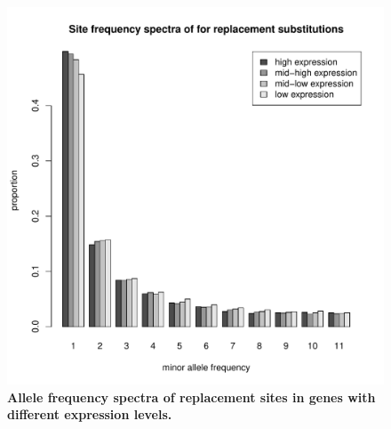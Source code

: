 \begin{figure}[h!]
      \centering
       \includegraphics[width=\linewidth]{Ch2FigS10}
    \caption{\textbf{Allele frequency spectra of replacement sites in genes with different expression levels.}}
    \label{fig:figS10}
\end{figure}

